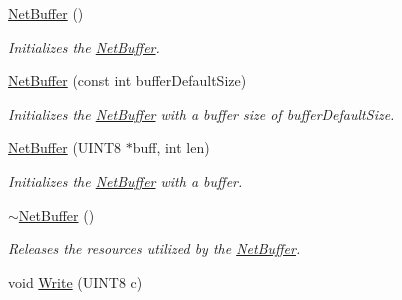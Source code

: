 \begin{DoxyCompactItemize}
\item 
\hypertarget{class_rhesus_1_1_toolkit_1_1_net_1_1_net_buffer_a5249b2bddb8de70ceb793f16584409bf}{\hyperlink{class_rhesus_1_1_toolkit_1_1_net_1_1_net_buffer_a5249b2bddb8de70ceb793f16584409bf}{Net\-Buffer} ()}\label{class_rhesus_1_1_toolkit_1_1_net_1_1_net_buffer_a5249b2bddb8de70ceb793f16584409bf}

\begin{DoxyCompactList}\small\item\em Initializes the \hyperlink{class_rhesus_1_1_toolkit_1_1_net_1_1_net_buffer}{Net\-Buffer}. \end{DoxyCompactList}\item 
\hypertarget{class_rhesus_1_1_toolkit_1_1_net_1_1_net_buffer_a230b5a4319c523589801f02b9a85fd13}{\hyperlink{class_rhesus_1_1_toolkit_1_1_net_1_1_net_buffer_a230b5a4319c523589801f02b9a85fd13}{Net\-Buffer} (const int buffer\-Default\-Size)}\label{class_rhesus_1_1_toolkit_1_1_net_1_1_net_buffer_a230b5a4319c523589801f02b9a85fd13}

\begin{DoxyCompactList}\small\item\em Initializes the \hyperlink{class_rhesus_1_1_toolkit_1_1_net_1_1_net_buffer}{Net\-Buffer} with a buffer size of buffer\-Default\-Size. \end{DoxyCompactList}\item 
\hypertarget{class_rhesus_1_1_toolkit_1_1_net_1_1_net_buffer_aa9ad4cec99599e38c277f6632dc62f53}{\hyperlink{class_rhesus_1_1_toolkit_1_1_net_1_1_net_buffer_aa9ad4cec99599e38c277f6632dc62f53}{Net\-Buffer} (U\-I\-N\-T8 $\ast$buff, int len)}\label{class_rhesus_1_1_toolkit_1_1_net_1_1_net_buffer_aa9ad4cec99599e38c277f6632dc62f53}

\begin{DoxyCompactList}\small\item\em Initializes the \hyperlink{class_rhesus_1_1_toolkit_1_1_net_1_1_net_buffer}{Net\-Buffer} with a buffer. \end{DoxyCompactList}\item 
\hypertarget{class_rhesus_1_1_toolkit_1_1_net_1_1_net_buffer_ad96acfc9ad9e5d2239b5b0f9594e2f8b}{\hyperlink{class_rhesus_1_1_toolkit_1_1_net_1_1_net_buffer_ad96acfc9ad9e5d2239b5b0f9594e2f8b}{$\sim$\-Net\-Buffer} ()}\label{class_rhesus_1_1_toolkit_1_1_net_1_1_net_buffer_ad96acfc9ad9e5d2239b5b0f9594e2f8b}

\begin{DoxyCompactList}\small\item\em Releases the resources utilized by the \hyperlink{class_rhesus_1_1_toolkit_1_1_net_1_1_net_buffer}{Net\-Buffer}. \end{DoxyCompactList}\item 
\hypertarget{class_rhesus_1_1_toolkit_1_1_net_1_1_net_buffer_a63e8fa8ae532047cca6563ae4a12ee6a}{void \hyperlink{class_rhesus_1_1_toolkit_1_1_net_1_1_net_buffer_a63e8fa8ae532047cca6563ae4a12ee6a}{Write} (U\-I\-N\-T8 c)}\label{class_rhesus_1_1_toolkit_1_1_net_1_1_net_buffer_a63e8fa8ae532047cca6563ae4a12ee6a}


\end{DoxyCompactItemize}
